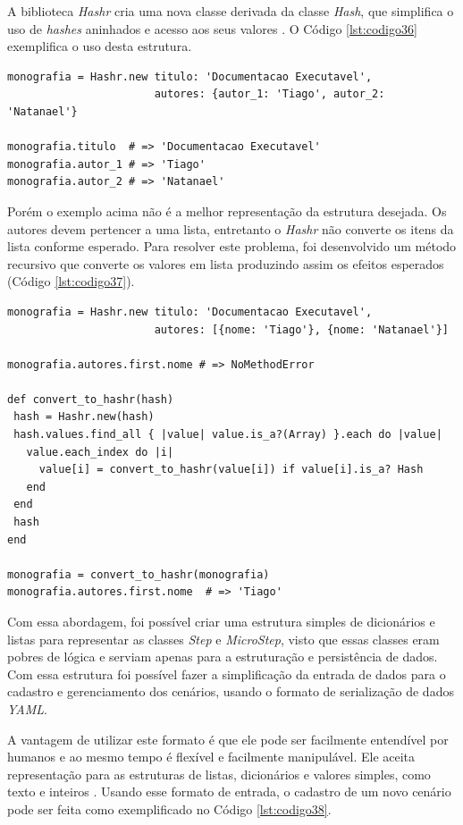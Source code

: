 A biblioteca \textit{Hashr} cria uma nova classe derivada da classe \textit{Hash}, que simplifica o uso de \textit{hashes} aninhados e acesso aos seus valores \cite{HASHR}. O Código \ref{lst:codigo36} exemplifica o uso desta estrutura.

{\singlespace
\begin{lstlisting}[caption=Exemplo de uso da estrutura \textit{Hashr},label={lst:codigo36}]
monografia = Hashr.new titulo: 'Documentacao Executavel',
                       autores: {autor_1: 'Tiago', autor_2: 'Natanael'}

monografia.titulo  # => 'Documentacao Executavel'
monografia.autor_1 # => 'Tiago'
monografia.autor_2 # => 'Natanael'

\end{lstlisting}
}

Porém o exemplo acima não é a melhor representação da estrutura desejada. Os autores devem pertencer a uma lista, entretanto o \textit{Hashr} não converte os itens da lista conforme esperado. Para resolver este problema, foi desenvolvido um método recursivo que converte os valores em lista produzindo assim os efeitos esperados (Código \ref{lst:codigo37}).

{\singlespace
\begin{lstlisting}[caption=Método de conversão para \textit{Hashr},label={lst:codigo37}]
monografia = Hashr.new titulo: 'Documentacao Executavel',
                       autores: [{nome: 'Tiago'}, {nome: 'Natanael'}]

monografia.autores.first.nome # => NoMethodError

def convert_to_hashr(hash)
 hash = Hashr.new(hash)
 hash.values.find_all { |value| value.is_a?(Array) }.each do |value|
   value.each_index do |i|
     value[i] = convert_to_hashr(value[i]) if value[i].is_a? Hash
   end
 end
 hash
end

monografia = convert_to_hashr(monografia)
monografia.autores.first.nome  # => 'Tiago'
\end{lstlisting}
}

Com essa abordagem, foi possível criar uma estrutura simples de dicionários e listas para representar as classes \textit{Step} e \textit{MicroStep}, visto que essas classes eram pobres de lógica e serviam apenas para a estruturação e persistência de dados. Com essa estrutura foi possível fazer a simplificação da entrada de dados para o cadastro e gerenciamento dos cenários, usando o formato de serialização de dados \textit{YAML}.

A vantagem de utilizar este formato é que ele pode ser facilmente entendível por humanos e ao mesmo tempo é flexível e facilmente manipulável. Ele aceita representação para as estruturas de listas, dicionários e valores simples, como texto e inteiros \cite{YAML}. Usando esse formato de entrada, o cadastro de um novo cenário pode ser feita como exemplificado no Código \ref{lst:codigo38}.

